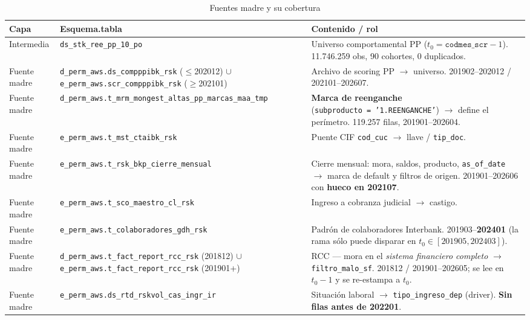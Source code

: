 \documentclass[12pt, a4paper]{article}
\begin{document}
\begin{table}[H]
\centering
\caption{Fuentes madre y su cobertura}
\label{tab:linaje_madre}
\scriptsize
\setlength{\tabcolsep}{4pt}
\begin{tabular}{p{2.5cm}p{5.3cm}p{5.5cm}}
\toprule
\textbf{Capa} & \textbf{Esquema.tabla} & \textbf{Contenido / rol} \\
\midrule
\addlinespace
Intermedia & \texttt{ds\_stk\_ree\_pp\_10\_po} & Universo comportamental PP ($t_0=\texttt{codmes\_scr}-1$). 11.746.259 obs, 90 cohortes, 0 duplicados. \\
\addlinespace
Fuente madre & \texttt{d\_perm\_aws.}\allowbreak\texttt{ds\_compppibk\_rsk} ($\le$202012) $\cup$ \texttt{e\_perm\_aws.}\allowbreak\texttt{scr\_compppibk\_rsk} ($\ge$202101) & Archivo de scoring PP $\to$ universo. 201902--202012 / 202101--202607. \\
Fuente madre & \texttt{d\_perm\_aws.}\allowbreak\texttt{t\_mrm\_mongest\_altas\_pp\_}\allowbreak\texttt{marcas\_maa\_tmp} & \textbf{Marca de reenganche} (\texttt{subproducto\ =\ '1.REENGANCHE'}) $\to$ define el perímetro. 119.257 filas, 201901--202604. \\
Fuente madre & \texttt{e\_perm\_aws.}\allowbreak\texttt{t\_mst\_ctaibk\_rsk} & Puente CIF \texttt{cod\_cuc} $\to$ llave / \texttt{tip\_doc}. \\
Fuente madre & \texttt{e\_perm\_aws.}\allowbreak\texttt{t\_rsk\_bkp\_cierre\_mensual} & Cierre mensual: mora, saldos, producto, \texttt{as\_of\_date} $\to$ marca de default y filtros de origen. 201901--202606 con \textbf{hueco en 202107}. \\
Fuente madre & \texttt{e\_perm\_aws.}\allowbreak\texttt{t\_sco\_maestro\_cl\_rsk} & Ingreso a cobranza judicial $\to$ castigo. \\
Fuente madre & \texttt{e\_perm\_aws.}\allowbreak\texttt{t\_colaboradores\_gdh\_rsk} & Padrón de colaboradores Interbank. 201903--\textbf{202401} (la rama sólo puede disparar en $t_0\in[201905,202403]$). \\
Fuente madre & \texttt{d\_perm\_aws.}\allowbreak\texttt{t\_fact\_report\_rcc\_rsk} (201812) $\cup$ \texttt{e\_perm\_aws.}\allowbreak\texttt{t\_fact\_report\_rcc\_rsk} (201901+) & RCC --- mora en el \emph{sistema financiero completo} $\to$ \texttt{filtro\_malo\_sf}. 201812 / 201901--202605; se lee en $t_0-1$ y se re-estampa a $t_0$. \\
Fuente madre & \texttt{e\_perm\_aws.}\allowbreak\texttt{ds\_rtd\_rskvol\_cas\_ingr\_ir} & Situación laboral $\to$ \texttt{tipo\_ingreso\_dep} (driver). \textbf{Sin filas antes de 202201}. \\

\end{tabular}
\end{table}
\end{document}
